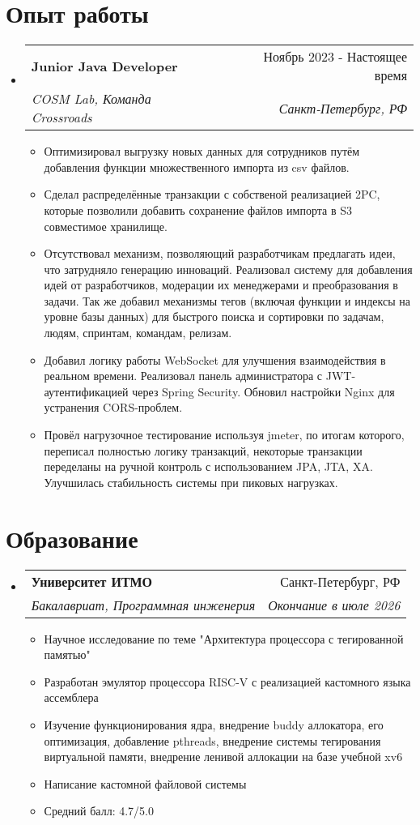 \documentclass[letterpaper,11pt]{article}
\makeatletter
\newcommand{\resumeItem}[1]{
  \item\small{
    {#1 \vspace{-2pt}}
  }
}
\newcommand{\resumeSubheading}[4]{
  \vspace{-2pt}\item
    \begin{tabular*}{0.97\textwidth}[t]{l@{\extracolsep{\fill}}r}
      \textbf{#1} & #2 \\
      \textit{\small#3} & \textit{\small #4} \\
    \end{tabular*}\vspace{-7pt}
}
\newcommand{\resumeSubHeadingListStart}{\begin{itemize}[leftmargin=0.15in, label={}]}
\newcommand{\resumeSubHeadingListEnd}{\end{itemize}}
\newcommand{\resumeItemListStart}{\begin{itemize}}
\newcommand{\resumeItemListEnd}{\end{itemize}\vspace{-5pt}}
\makeatother
\begin{document}
\section{Опыт работы}
\resumeSubHeadingListStart
  \resumeSubheading
    {Junior Java Developer}{Ноябрь 2023 - Настоящее время}
    {COSM Lab, Команда Crossroads}{Санкт-Петербург, РФ}
    \resumeItemListStart
      \resumeItem{Оптимизировал выгрузку новых данных для сотрудников путём добавления функции множественного импорта из csv файлов.}
      \resumeItem{Сделал распределённые транзакции с собственой реализацией 2PC, которые позволили добавить сохранение файлов импорта в S3 совместимое хранилище.}
      \resumeItem{Отсутствовал механизм, позволяющий разработчикам предлагать идеи, что затрудняло генерацию инноваций. Реализовал систему для добавления идей от разработчиков, модерации их менеджерами и преобразования в задачи. Так же добавил механизмы тегов (включая функции и индексы на уровне базы данных) для быстрого поиска и сортировки по задачам, людям, спринтам, командам, релизам.}
      \resumeItem{Добавил логику работы WebSocket для улучшения взаимодействия в реальном времени. Реализовал панель администратора с JWT-аутентификацией через Spring Security. Обновил настройки Nginx для устранения CORS-проблем.}
      \resumeItem{Провёл нагрузочное тестирование используя jmeter, по итогам которого, переписал полностью логику транзакций, некоторые транзакции переделаны на ручной контроль с использованием JPA, JTA, XA. Улучшилась стабильность системы при пиковых нагрузках.}
      \resumeItemListEnd
  \resumeSubHeadingListEnd

\section{Образование}
  \resumeSubHeadingListStart
    \resumeSubheading
      {Университет ИТМО}{Санкт-Петербург, РФ}
      {Бакалавриат, Программная инженерия}{Окончание в июле 2026}
          \resumeItemListStart
            \resumeItem{Научное исследование по теме "Архитектура процессора с тегированной памятью"}
            \resumeItem{Разработан эмулятор процессора RISC-V с реализацией кастомного языка ассемблера}
            \resumeItem{Изучение функционирования ядра, внедрение buddy аллокатора, его оптимизация, добавление pthreads, внедрение системы тегирования виртуальной памяти, внедрение ленивой аллокации на базе учебной xv6}
            \resumeItem{Написание кастомной файловой системы}
            \resumeItem{Средний балл: 4.7/5.0}
        \resumeItemListEnd
  \resumeSubHeadingListEnd
\end{document}
